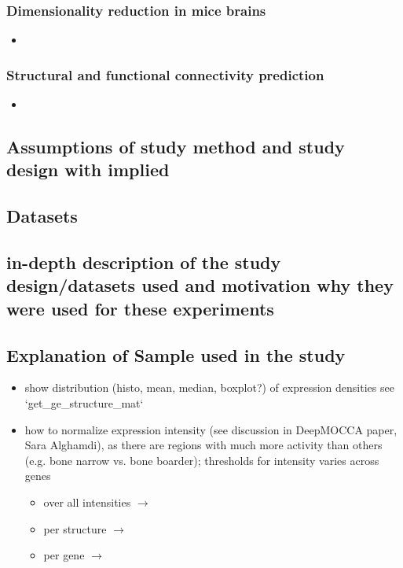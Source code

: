 \documentclass[]{article}
\begin{document}
\subsubsection{Dimensionality reduction in mice brains}
\begin{itemize}
	\item 
\end{itemize}

\subsubsection{Structural and functional connectivity prediction}
\begin{itemize}
	\item 
\end{itemize}


\subsection*{Assumptions of study method and study design with implied }

\subsection{Datasets}
\subsection*{in-depth description of the study design/datasets used and motivation why they were used for these experiments}
\subsection*{Explanation of Sample used in the study}
\begin{itemize}
	\item show distribution (histo, mean, median, boxplot?) of expression densities see `get\_ge\_structure\_mat`

	\item how to normalize expression intensity (see discussion in DeepMOCCA paper, Sara Alghamdi), as there are regions with much more activity than others (e.g. bone narrow vs. bone boarder); thresholds for intensity varies across genes
	
	\begin{itemize}
		\item over all intensities $\rightarrow$
		\item per structure $\rightarrow$  
		\item per gene $\rightarrow$ 
	\end{itemize}
\end{itemize}
\end{document}
